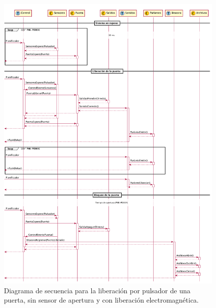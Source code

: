\begin{figure}[ht]
	\centering
	\includegraphics[width=\textwidth]{Figures/PNK-DS001.pdf}
	\caption[Apertura por pulsador con cerradura electromagnética y sin sensor]{Diagrama de secuencia para la liberación por pulsador de una puerta, sin sensor de apertura y con liberación electromagnética.}
	\label{fig:SecuanciaPulsador}
\end{figure}

